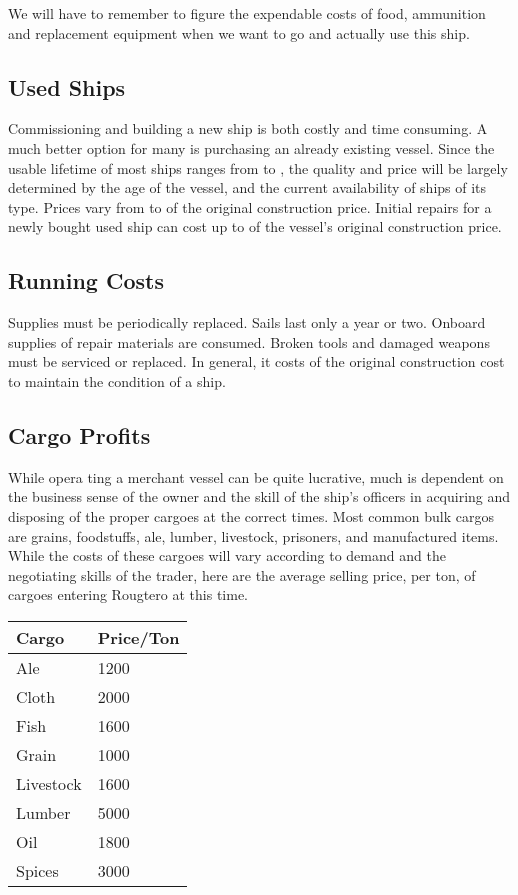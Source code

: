 \begin{multicols*}{2}
We will have to remember to figure the expendable costs of food, ammunition and replacement equipment when we want to go and actually use this ship.
\subsection{Used Ships}
Commissioning and building a new ship is both costly and time consuming. A much better option for many is purchasing an already existing vessel. Since the usable lifetime of most ships ranges from  to , the quality and price will be largely determined by the age of the vessel, and the current availability of ships of its type. Prices vary from  to  of the original construction price. Initial repairs for a newly bought used ship can cost up to  of the vessel’s original construction price.
\subsection{Running Costs}
Supplies must be periodically replaced. Sails last only a year or two. Onboard supplies of repair materials are consumed. Broken tools and damaged weapons must be serviced or replaced. In general, it costs  of the original construction cost  to maintain the condition of a ship.
\subsection{Cargo Profits}
While opera ting a merchant vessel can be quite lucrative, much is dependent on the business sense of the owner and the skill of the ship’s officers in acquiring and disposing of the proper cargoes at the correct times. Most common bulk cargos are grains, foodstuffs, ale, lumber,  livestock, prisoners, and manufactured items. While the costs of
these cargoes will vary according to demand and the negotiating skills of the trader, here are the average selling price, per ton, of cargoes entering Rougtero at this time.
\begin{normbox}
\small
\begin{tabular}{@{} l l}
\textbf{Cargo} & \textbf{Price/Ton}\\
\midrule
Ale & 1200\\
Cloth & 2000\\
Fish & 1600\\
Grain & 1000\\
Livestock & 1600\\
Lumber & 5000\\
Oil & 1800\\
Spices & 3000\\
\end{tabular}
\end{normbox}

\end{multicols*}
